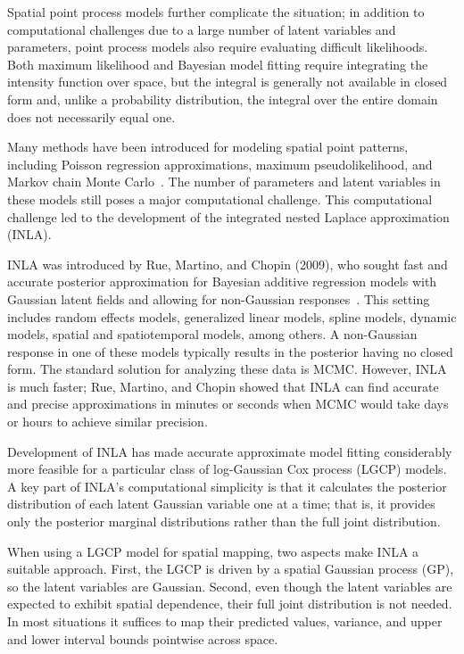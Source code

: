 \documentclass[]{interact}
\begin{document}
Spatial point process models further complicate the situation; in addition to
computational challenges due to a large number of latent variables and
parameters, point process models also require evaluating difficult
likelihoods. Both maximum likelihood and Bayesian model fitting require
integrating the intensity function over space, but the integral is generally
not available in closed form and, unlike a probability distribution, the
integral over the entire domain does not necessarily equal one.

Many methods have been introduced for modeling spatial point patterns,
including Poisson regression approximations, maximum pseudolikelihood, and
Markov chain Monte
Carlo~\cite{bermanturner,baddeleyetal,baddeleyturner,moellerwaagepetersen}.
The number of parameters and latent variables in these models still poses a
major computational challenge. This computational challenge led to the
development of the integrated nested Laplace approximation (INLA).

INLA was introduced by Rue, Martino, and Chopin (2009), who sought fast and
accurate posterior approximation for Bayesian additive regression models with
Gaussian latent fields and allowing for non-Gaussian responses~\cite{rueetal}.
This setting includes random effects models, generalized linear models, spline
models, dynamic models, spatial and spatiotemporal models, among others.
A non-Gaussian response in one of these models typically results in the
posterior having no closed form. The standard solution for analyzing these
data is MCMC. However, INLA is much faster; Rue,
Martino, and Chopin showed that INLA can find accurate and precise
approximations in minutes or seconds when MCMC would take days or hours to
achieve similar precision.

Development of INLA has made accurate approximate model fitting considerably
more feasible for a particular class of log-Gaussian Cox process (LGCP)
models. A key part of INLA's computational simplicity is that it calculates
the posterior distribution of each latent Gaussian variable one at a time;
that is, it provides only the posterior marginal distributions rather than the
full joint distribution.

When using a LGCP model for spatial mapping, two aspects make INLA a suitable
approach. First, the LGCP is driven by a spatial Gaussian process (GP), so the
latent variables are Gaussian. Second, even though the latent variables are
expected to exhibit spatial dependence, their full joint distribution is not
needed. In most situations it suffices to map their predicted values, variance,
and upper and lower interval bounds pointwise across space.
\end{document}
